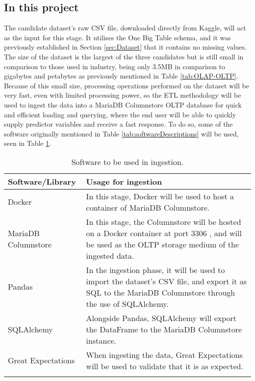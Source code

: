 \subsection{In this project}
The candidate dataset's raw CSV file, downloaded directly from Kaggle, will act as the input for this stage. It utilises the One Big Table schema, 
and it was previously established in Section \ref{sec:Dataset} that it contains no missing values. 
The size of the dataset is the largest of the three candidates but is still
small in comparison to those used in industry, being only 3.5MB in comparison to gigabytes and petabytes as previously 
mentioned in Table \ref{tab:OLAP-OLTP}. Because of this small size, processing operations performed on the dataset 
will be very fast, even with limited processing power, so the ETL methodology will be used to ingest the data 
into a MariaDB Columnstore OLTP database for quick and efficient loading and querying, where the end user will be 
able to quickly supply predictor variables and receive a fast response. To do so, 
some of the software originally mentioned in Table \ref{tab:softwareDescriptions} will be used, seen in Table \ref{tab:IngestionSoftware}.




\begin{longtable}{ |p{}| p{}|}
    \hline
    \cellcolor{blue!25}Software/Library & \cellcolor{blue!25}Usage for ingestion\\
    \hline
    Docker &
    In this stage, Docker will be used to host a container of MariaDB Columnstore.\\
    \hline
    MariaDB Columnstore &
    In this stage, the Columnstore will be hosted on a Docker container at port 3306 \autocite{docker_hub_mariadbcolumnstore_nodate}, 
    and will be used as the OLTP storage medium of the ingested data.\\
    \hline 
    Pandas &
    In the ingestion phase, it will be used to import the dataset's CSV file, and export it as SQL to 
    the MariaDB Columnstore through the use of SQLAlchemy.\\
    \hline
    SQLAlchemy &
    Alongside Pandas, SQLAlchemy will export the DataFrame to the MariaDB Columnstore instance.\\
    \hline 
    Great Expectations & When ingesting the data, Great Expectations will be used to validate that it is as expected.\\
    \hline
\caption{Software to be used in ingestion.}\label{tab:IngestionSoftware}
\end{longtable}

